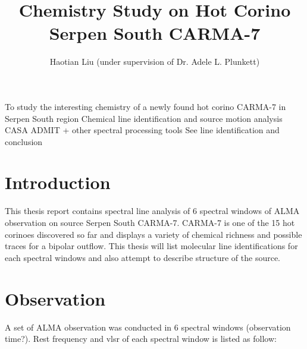 \documentclass{aa}
\begin{document}
 


   \title{Chemistry Study on Hot Corino Serpen South CARMA-7}



   \author{Haotian Liu (under supervision of Dr. Adele L. Plunkett)}





 
  \abstract
   {To study the interesting chemistry of a newly found hot corino CARMA-7 in Serpen South region}
   {Chemical line identification and source motion analysis}
   {CASA ADMIT + other spectral processing tools}
   {See line identification and conclusion}
   {}


   \maketitle
%

\section{Introduction}

    This thesis report contains spectral line analysis of 6 spectral windows of ALMA observation on source Serpen South CARMA-7. CARMA-7 is one of the 15 hot corinoes discovered so far and displays a variety of chemical richness and possible traces for a bipolar outflow. This thesis will list molecular line identifications for each spectral windows and also attempt to describe structure of the source.

\section{Observation}
   A set of ALMA observation was conducted in 6 spectral windows (observation time?). Rest frequency and vlsr of each spectral window is listed as follow:
   
\end{document}

